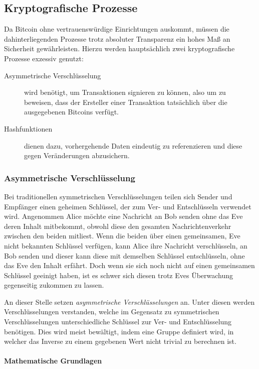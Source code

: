 \subsection{Kryptografische Prozesse}

Da Bitcoin ohne vertrauenswürdige Einrichtungen auskommt, müssen die dahinterliegenden Prozesse trotz absoluter Transparenz ein hohes Maß an Sicherheit gewährleisten.
Hierzu werden hauptsächlich zwei kryptografische Prozesse exzessiv genutzt:
\begin{description}
    \item[Asymmetrische Verschlüsselung] wird benötigt, um Transaktionen signieren zu können, also um zu beweisen, dass der Ersteller einer Transaktion tatsächlich über die ausgegebenen Bitcoins verfügt.
    \item[Hashfunktionen] dienen dazu, vorhergehende Daten eindeutig zu referenzieren und diese gegen Veränderungen abzusichern.
\end{description}

\subsubsection{Asymmetrische Verschlüsselung}

Bei traditionellen symmetrischen Verschlüsselungen teilen sich Sender und Empfänger einen geheimen Schlüssel, der zum Ver- und Entschlüsseln verwendet wird.
Angenommen Alice möchte eine Nachricht an Bob senden ohne das Eve deren Inhalt mitbekommt, obwohl diese den gesamten Nachrichtenverkehr zwischen den beiden mitliest.
Wenn die beiden über einen gemeinsamen, Eve nicht bekannten Schlüssel verfügen, kann Alice ihre Nachricht verschlüsseln, an Bob senden und dieser kann diese mit demselben Schlüssel entschlüsseln, ohne das Eve den Inhalt erfährt.
Doch wenn sie sich noch nicht auf einen gemeinsamen Schlüssel geeinigt haben, ist es schwer sich diesen trotz Eves Überwachung gegenseitig zukommen zu lassen.

An dieser Stelle setzen \emph{asymmetrische Verschlüsselungen} an.
Unter diesen werden Verschlüsselungen verstanden, welche im Gegensatz zu symmetrischen Verschlüsselungen unterschiedliche Schlüssel zur Ver- und Entschlüsselung benötigen.
Dies wird meist bewältigt, indem eine Gruppe definiert wird, in welcher das Inverse zu einem gegebenen Wert nicht trivial zu berechnen ist.

\paragraph{Mathematische Grundlagen}

